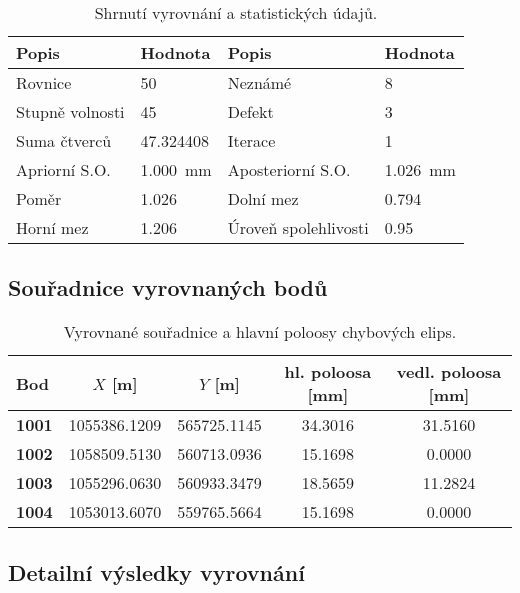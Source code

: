 \begin{table}[H]
    \centering
    \begin{tabularx}{\textwidth}{@{} l X l X @{}}
    \toprule
    \textbf{Popis} & \textbf{Hodnota} & \textbf{Popis} & \textbf{Hodnota} \\
    \midrule
    Rovnice & 50 & Neznámé & 8 \\
    Stupně volnosti & 45 & Defekt & 3 \\
    Suma čtverců & \num{47.324408} & Iterace & 1 \\
    Apriorní S.O. & \SI{1.000}{mm} & Aposteriorní S.O. & \SI{1.026}{mm} \\
    Poměr & \num{1.026} & Dolní mez & \num{0.794} \\
    Horní mez & \num{1.206} & Úroveň spolehlivosti & \num{0.95} \\
    \bottomrule
    \end{tabularx}
    \caption{Shrnutí vyrovnání a statistických údajů.}
    \label{tab:adjustment_summary_vse}
\end{table}

\subsection{Souřadnice vyrovnaných bodů}
\begin{table}[H]
    \centering
    \begin{tabularx}{\textwidth}{@{} l S[table-format=10.4] S[table-format=10.4] S[table-format=2.4] S[table-format=2.4] @{}}
    \toprule
    \textbf{Bod} & {$X$ [\si{\m}]} & {$Y$ [\si{\m}]} & \textbf{hl. poloosa [\si{\mm}]} & \textbf{vedl. poloosa [\si{\mm}]} \\
    \midrule
    \textbf{1001} & \num{1055386.1209} & \num{565725.1145} & \num{34.3016} & \num{31.5160} \\
    \textbf{1002} & \num{1058509.5130} & \num{560713.0936} & \num{15.1698} & \num{0.0000} \\
    \textbf{1003} & \num{1055296.0630} & \num{560933.3479} & \num{18.5659} & \num{11.2824} \\
    \textbf{1004} & \num{1053013.6070} & \num{559765.5664} & \num{15.1698} & \num{0.0000} \\
    \bottomrule
    \end{tabularx}
    \caption{Vyrovnané souřadnice a hlavní poloosy chybových elips.}
    \label{tab:adjusted_coords_vse}
\end{table}

\subsection{Detailní výsledky vyrovnání}

